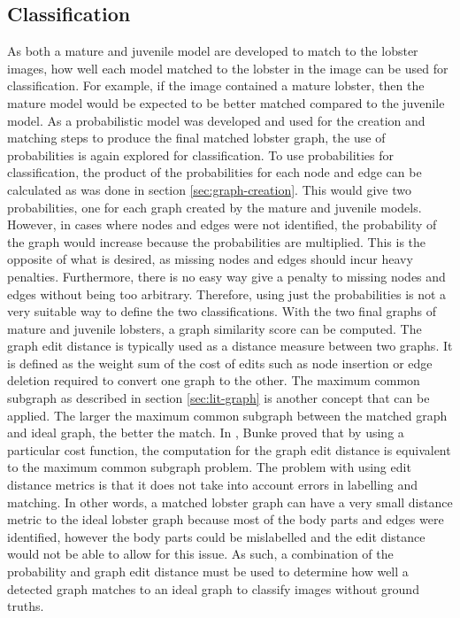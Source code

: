 \subsection{Classification}
As both a mature and juvenile model are developed to match to the lobster images, how well each model matched to the lobster in the image can be used for classification. For example, if the image contained a mature lobster, then the mature model would be expected to be better matched compared to the juvenile model. 
\n
As a probabilistic model was developed and used for the creation and matching steps to produce the final matched lobster graph, the use of probabilities is again explored for classification. To use probabilities for classification, the product of the probabilities for each node and edge can be calculated as was done in section \ref{sec:graph-creation}. This would give two probabilities, one for each graph created by the mature and juvenile models. However, in cases where nodes and edges were not identified, the probability of the graph would increase because the probabilities are multiplied. This is the opposite of what is desired, as missing nodes and edges should incur heavy penalties. Furthermore, there is no easy way give a penalty to missing nodes and edges without being too arbitrary. Therefore, using just the probabilities is not a very suitable way to define the two classifications.
\n
With the two final graphs of mature and juvenile lobsters, a graph similarity score can be computed. The graph edit distance is typically used as a distance measure between two graphs. It is defined as the weight sum of the cost of edits such as node insertion or edge deletion required to convert one graph to the other. The maximum common subgraph as described in section \ref{sec:lit-graph} is another concept that can be applied. The larger the maximum common subgraph between the matched graph and ideal graph, the better the match. In \cite{graph-edit}, Bunke proved that by using a particular cost function, the computation for the graph edit distance is equivalent to the maximum common subgraph problem. The problem with using edit distance metrics is that it does not take into account errors in labelling and matching. In other words, a matched lobster graph can have a very small distance metric to the ideal lobster graph because most of the body parts and edges were identified, however the body parts could be mislabelled and the edit distance would not be able to allow for this issue. 
\n
As such, a combination of the probability and graph edit distance must be used to determine how well a detected graph matches to an ideal graph to classify images without ground truths. 

